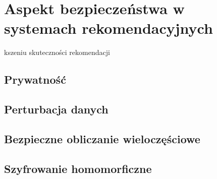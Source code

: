 
\chapter{Aspekt bezpieczeństwa w systemach rekomendacyjnych}
kszeniu skuteczności rekomendacji \cite{recent_developments}


\section{Prywatność}

\section{Perturbacja danych}

\section{Bezpieczne obliczanie wieloczęściowe}

\section{Szyfrowanie homomorficzne}